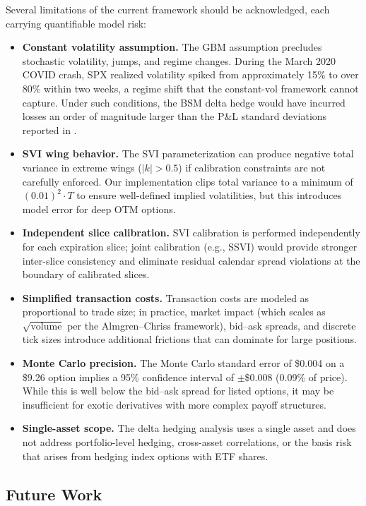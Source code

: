 \documentclass[11pt,a4paper]{article}
\begin{document}
Several limitations of the current framework should be acknowledged, each carrying quantifiable model risk:
\begin{itemize}[nosep]
    \item \textbf{Constant volatility assumption.} The GBM assumption precludes stochastic volatility, jumps, and regime changes. During the March 2020 COVID crash, SPX realized volatility spiked from approximately 15\% to over 80\% within two weeks, a regime shift that the constant-vol framework cannot capture. Under such conditions, the BSM delta hedge would have incurred losses an order of magnitude larger than the P\&L standard deviations reported in .
    \item \textbf{SVI wing behavior.} The SVI parameterization can produce negative total variance in extreme wings ($|k| > 0.5$) if calibration constraints are not carefully enforced. Our implementation clips total variance to a minimum of $(0.01)^2 \cdot T$ to ensure well-defined implied volatilities, but this introduces model error for deep OTM options.
    \item \textbf{Independent slice calibration.} SVI calibration is performed independently for each expiration slice; joint calibration (e.g., SSVI) would provide stronger inter-slice consistency and eliminate residual calendar spread violations at the boundary of calibrated slices.
    \item \textbf{Simplified transaction costs.} Transaction costs are modeled as proportional to trade size; in practice, market impact (which scales as $\sqrt{\text{volume}}$ per the Almgren--Chriss framework), bid--ask spreads, and discrete tick sizes introduce additional frictions that can dominate for large positions.
    \item \textbf{Monte Carlo precision.} The Monte Carlo standard error of \$0.004 on a \$9.26 option implies a 95\% confidence interval of $\pm$\$0.008 (0.09\% of price). While this is well below the bid--ask spread for listed options, it may be insufficient for exotic derivatives with more complex payoff structures.
    \item \textbf{Single-asset scope.} The delta hedging analysis uses a single asset and does not address portfolio-level hedging, cross-asset correlations, or the basis risk that arises from hedging index options with ETF shares.
\end{itemize}

\subsection{Future Work}
\end{document}
